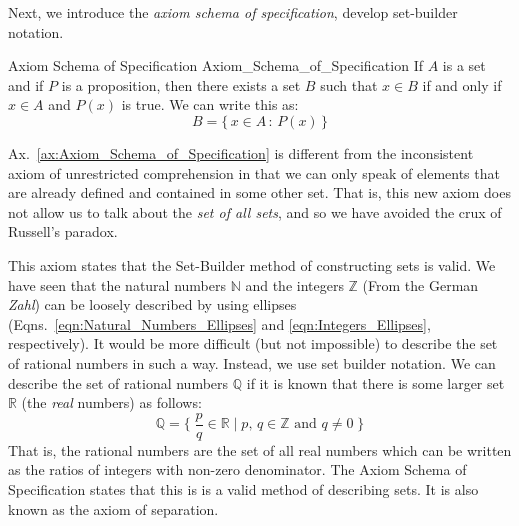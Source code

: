         Next, we introduce the \textit{axiom schema of specification},
        develop set-builder notation.
        \begin{faxiom}{Axiom Schema of Specification}
                      {Axiom_Schema_of_Specification}
            If $A$ is a set and if $P$ is a proposition, then there exists
            a set $B$ such that $x\in{B}$ if and only if $x\in{A}$ and
            $P(x)$ is true. We can write this as:
            \begin{equation}
                B=\{\,x\in{A}\,:\,P(x)\,\}
            \end{equation}
        \end{faxiom}
        Ax.~\ref{ax:Axiom_Schema_of_Specification} is different from the
        inconsistent axiom of unrestricted comprehension in that we can only
        speak of elements that are already defined and contained in some other
        set. That is, this new axiom does not allow us to talk about the
        \textit{set of all sets}, and so we have avoided the crux of
        Russell's paradox.
        \par\hfill\par
        This axiom states that the Set-Builder method of constructing
        sets is valid. We have seen that the natural numbers
        $\mathbb{N}$ and the integers $\mathbb{Z}$ (From the German
        \textit{Zahl}) can be loosely described by using ellipses
        (Eqns.~\ref{eqn:Natural_Numbers_Ellipses} and
        \ref{eqn:Integers_Ellipses}, respectively). It would be more
        difficult (but not impossible) to describe the set of rational
        numbers in such a way. Instead, we use set builder notation. We
        can describe the set of rational numbers $\mathbb{Q}$ if it is known
        that there is some larger set $\mathbb{R}$ (the \textit{real} numbers)
        as follows:
        \begin{equation}
            \mathbb{Q}=\Big\{\;\frac{p}{q}\in\mathbb{R}\;|
                               \;p,\,q\in\mathbb{Z}
                               \textrm{ and }q\ne{0}\;\Big\}
        \end{equation}
        That is, the rational numbers are the set of all real numbers which
        can be written as the ratios of integers with non-zero denominator.
        The Axiom Schema of Specification states that this is is a valid
        method of describing sets. It is also known as the axiom of
        separation.
